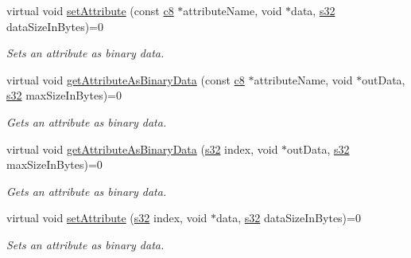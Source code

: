 \begin{DoxyCompactItemize}
\mbox{\label{classirr_1_1io_1_1IAttributes_a2901bd83d186222fc0c9d56a324e6318}} 
virtual void \hyperlink{classirr_1_1io_1_1IAttributes_a2901bd83d186222fc0c9d56a324e6318}{set\+Attribute} (const \hyperlink{namespaceirr_a9395eaea339bcb546b319e9c96bf7410}{c8} $\ast$attribute\+Name, void $\ast$data, \hyperlink{namespaceirr_ac66849b7a6ed16e30ebede579f9b47c6}{s32} data\+Size\+In\+Bytes)=0
\begin{DoxyCompactList}\small\item\em Sets an attribute as binary data. \end{DoxyCompactList}\item 
virtual void \hyperlink{classirr_1_1io_1_1IAttributes_acfb2d9c332942601f2e9757ddd8f999a}{get\+Attribute\+As\+Binary\+Data} (const \hyperlink{namespaceirr_a9395eaea339bcb546b319e9c96bf7410}{c8} $\ast$attribute\+Name, void $\ast$out\+Data, \hyperlink{namespaceirr_ac66849b7a6ed16e30ebede579f9b47c6}{s32} max\+Size\+In\+Bytes)=0
\begin{DoxyCompactList}\small\item\em Gets an attribute as binary data. \end{DoxyCompactList}\item 
virtual void \hyperlink{classirr_1_1io_1_1IAttributes_adcb3d463be127839c71838a050079b55}{get\+Attribute\+As\+Binary\+Data} (\hyperlink{namespaceirr_ac66849b7a6ed16e30ebede579f9b47c6}{s32} index, void $\ast$out\+Data, \hyperlink{namespaceirr_ac66849b7a6ed16e30ebede579f9b47c6}{s32} max\+Size\+In\+Bytes)=0
\begin{DoxyCompactList}\small\item\em Gets an attribute as binary data. \end{DoxyCompactList}\item 
\mbox{\label{classirr_1_1io_1_1IAttributes_a26d06e1f7da14ce1bfb7b84c0b22dd64}} 
virtual void \hyperlink{classirr_1_1io_1_1IAttributes_a26d06e1f7da14ce1bfb7b84c0b22dd64}{set\+Attribute} (\hyperlink{namespaceirr_ac66849b7a6ed16e30ebede579f9b47c6}{s32} index, void $\ast$data, \hyperlink{namespaceirr_ac66849b7a6ed16e30ebede579f9b47c6}{s32} data\+Size\+In\+Bytes)=0
\begin{DoxyCompactList}\small\item\em Sets an attribute as binary data. \end{DoxyCompactList}\item 
\mbox{\label{classirr_1_1io_1_1IAttributes_abbf204e53ef70b89fc25a98f01111031}} 

\end{DoxyCompactItemize}
